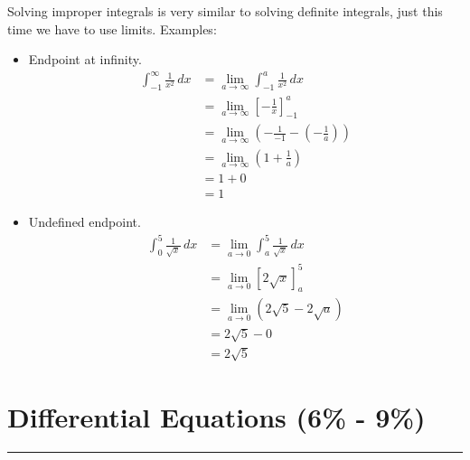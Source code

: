 \documentclass[12pt]{article}
\newcommand{\fline}{\par\noindent\rule{\textwidth}{0.1pt}} %
\begin{document}
Solving improper integrals is very similar to solving definite integrals, just this time we have to use limits. Examples:
\begin{itemize}
    \item Endpoint at infinity.
          \begin{align*}
              \int_{-1}^{\infty} \frac{1}{x^2} \, dx & = \lim_{a \to \infty} \int_{-1}^{a} \frac{1}{x^2} \, dx                          \\[6pt]
                                                     & = \lim_{a \to \infty} \left[ -\frac{1}{x} \right]_{-1}^{a}                       \\[6pt]
                                                     & = \lim_{a \to \infty} \left( -\frac{1}{-1} - \left( -\frac{1}{a} \right) \right) \\[6pt]
                                                     & = \lim_{a \to \infty} \left( 1 + \frac{1}{a} \right)                             \\[6pt]
                                                     & = 1+0                                                                            \\
                                                     & = 1
          \end{align*}

    \item Undefined endpoint.
          \begin{align*}
              \int_{0}^{5} \frac{1}{\sqrt{x}} \, dx & = \lim_{a \to 0} \int_{a}^{5} \frac{1}{\sqrt{x}} \, dx \\[6pt]
                                                    & = \lim_{a \to 0} \left[ 2\sqrt{x} \right]_{a}^{5}      \\
                                                    & = \lim_{a \to 0} \left( 2\sqrt{5} - 2\sqrt{a} \right)  \\
                                                    & = 2\sqrt{5} - 0                                        \\
                                                    & = 2\sqrt{5}
          \end{align*}
\end{itemize}

\section{Differential Equations (6\% - 9\%)}
\fline
\end{document}
